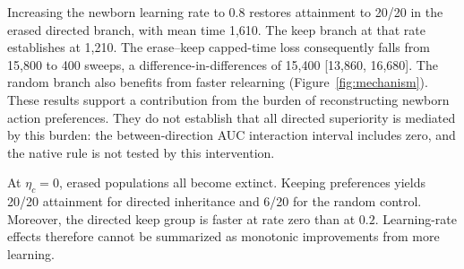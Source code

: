 \documentclass[11pt]{article}
\begin{document}
Increasing the newborn learning rate to $0.8$ restores attainment to 20/20 in the erased directed branch, with mean time 1,610. The keep branch at that rate establishes at 1,210. The erase--keep capped-time loss consequently falls from 15,800 to 400 sweeps, a difference-in-differences of 15,400 [13,860, 16,680]. The random branch also benefits from faster relearning (Figure~\ref{fig:mechanism}). These results support a contribution from the burden of reconstructing newborn action preferences. They do not establish that all directed superiority is mediated by this burden: the between-direction AUC interaction interval includes zero, and the native rule is not tested by this intervention.

At $\eta_c=0$, erased populations all become extinct. Keeping preferences yields 20/20 attainment for directed inheritance and 6/20 for the random control. Moreover, the directed keep group is faster at rate zero than at $0.2$. Learning-rate effects therefore cannot be summarized as monotonic improvements from more learning.
\end{document}
